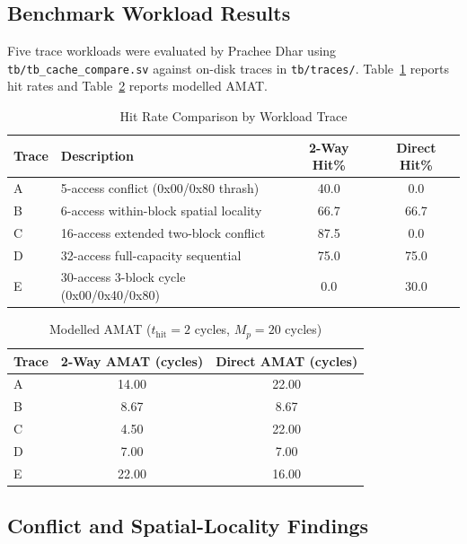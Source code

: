 \documentclass[conference]{IEEEtran}
\begin{document}
\subsection{Benchmark Workload Results}
\label{subsec:benchmarks}

Five trace workloads were evaluated by Prachee Dhar using
{\tt tb/tb\_cache\_compare.sv} against on-disk traces in
{\tt tb/traces/}.
Table~\ref{tab:hitrates} reports hit rates and Table~\ref{tab:amat_table}
reports modelled AMAT.

\begin{table}[h]
  \caption{Hit Rate Comparison by Workload Trace}
  \label{tab:hitrates}
  \centering
  \small
  \begin{tabular}{lp{3.0cm}cc}
    \toprule
    Trace & Description & 2-Way Hit\% & Direct Hit\% \\
    \midrule
    A & 5-access conflict (0x00/0x80 thrash)   & 40.0  & 0.0  \\
    B & 6-access within-block spatial locality  & 66.7  & 66.7 \\
    C & 16-access extended two-block conflict   & 87.5  & 0.0  \\
    D & 32-access full-capacity sequential      & 75.0  & 75.0 \\
    E & 30-access 3-block cycle (0x00/0x40/0x80)& 0.0   & 30.0 \\
    \bottomrule
  \end{tabular}
\end{table}

\begin{table}[h]
  \caption{Modelled AMAT ($t_{\text{hit}}=2$ cycles, $M_p=20$ cycles)}
  \label{tab:amat_table}
  \centering
  \small
  \begin{tabular}{lcc}
    \toprule
    Trace & 2-Way AMAT (cycles) & Direct AMAT (cycles) \\
    \midrule
    A &  14.00 & 22.00 \\
    B &   8.67 &  8.67 \\
    C &   4.50 & 22.00 \\
    D &   7.00 &  7.00 \\
    E &  22.00 & 16.00 \\
    \bottomrule
  \end{tabular}
\end{table}

\subsection{Conflict and Spatial-Locality Findings}
\label{subsec:conflict}
\end{document}
